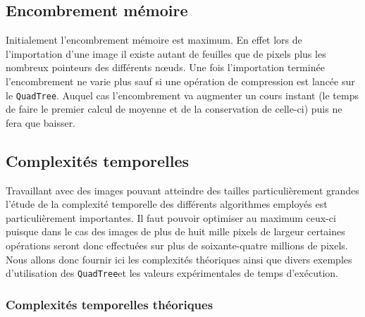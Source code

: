 \documentclass{article}
\newcommand{\info}{\texttt}
\newcommand{\qt}{\info{QuadTree}}
\begin{document}
    \subsection{Encombrement mémoire}
    
    Initialement l'encombrement mémoire est maximum. En effet lors de l'importation d'une image il existe autant de feuilles que de pixels plus les nombreux pointeurs des différents nœuds. Une fois l'importation terminée l'encombrement ne varie plus sauf si une opération de compression est lancée sur le \qt. Auquel cas l'encombrement va augmenter un cours instant (le temps de faire le premier calcul de moyenne et de la conservation de celle-ci) puis ne fera que baisser.
    
    \subsection{Complexités temporelles}

    Travaillant avec des images pouvant atteindre des tailles particulièrement grandes l'étude de la complexité temporelle des différents algorithmes employés est particulièrement importantes. Il faut pouvoir optimiser au maximum ceux-ci puisque dans le cas des images de plus de huit mille pixels de largeur certaines opérations seront donc effectuées sur plus de soixante-quatre millions de pixels. Nous allons donc fournir ici les complexités théoriques ainsi que divers exemples d'utilisation des \qt et les valeurs expérimentales de temps d'exécution.
    
        \subsubsection{Complexités temporelles théoriques}
        
\end{document}
